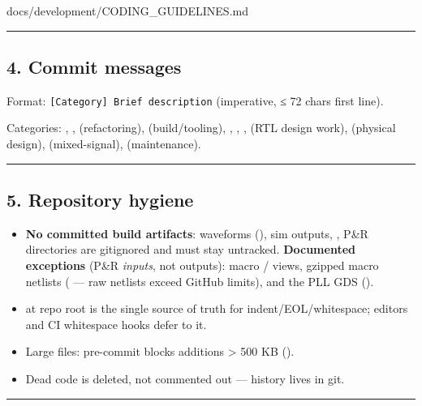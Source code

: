 \begin{relocated}{docs/development/CODING_GUIDELINES.md}
\begin{center}\rule{0.5\linewidth}{0.5pt}\end{center}

\subsection{4. Commit messages}\label{um:guide:coding-guidelines:4-commit-messages}

Format: \texttt{[Category]\ Brief\ description} (imperative, ≤ 72 chars
first line).

Categories: \code{[Fix]}, \code{[Feature]}, \code{[Code]} (refactoring),
\code{[Env]} (build/\allowbreak{}tooling), \code{[Doc]}, \code{[Test]},
\code{[Spec]}, \code{[RTL]} (RTL design work), \code{[PD]} (physical
design), \code{[Analog]} (mixed-signal), \code{[Chore]} (maintenance).

\begin{center}\rule{0.5\linewidth}{0.5pt}\end{center}

\subsection{5. Repository hygiene}\label{um:guide:coding-guidelines:5-repository-hygiene}

\begin{itemize}
\tightlist
\item
  \textbf{No committed build artifacts}: waveforms (), sim
  outputs, , P\&R  directories are gitignored
  and must stay untracked. \textbf{Documented exceptions} (P\&R
  \emph{inputs}, not outputs): macro / views,
  gzipped macro netlists ( --- raw netlists
  exceed GitHub limits), and the PLL GDS
  ().
\item
   at repo root is the single source of truth for
  indent/\allowbreak{}EOL/\allowbreak{}whitespace; editors and CI
  whitespace hooks defer to it.
\item
  Large files: pre-commit blocks additions \textgreater{} 500 KB
  ().
\item
  Dead code is deleted, not commented out --- history lives in git.
\end{itemize}

\begin{center}\rule{0.5\linewidth}{0.5pt}\end{center}


\end{relocated}
